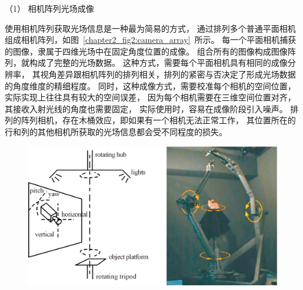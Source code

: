 

（1）
相机阵列光场成像


%
%
%


使用相机阵列获取光场信息是一种最为简易的方式，
通过排列多个普通平面相机组成相机阵列，如图~\ref{chapter2_fig2:camera_array}~所示。
每一个平面相机捕获的图像，隶属于四维光场中在固定角度位置的成像。
组合所有的图像构成图像阵列，就构成了完整的光场数据。
这种方式，需要每个平面相机具有相同的成像分辨率，
其视角差异跟相机阵列的排列相关，排列的紧密与否决定了形成光场数据的角度维度的精细程度。
同时，这种成像方式，需要校准每个相机的空间位置，实际实现上往往具有较大的空间误差，
因为每个相机需要在三维空间位置对齐，其接收入射光线的角度也需要固定，
实际使用时，容易在成像阶段引入噪声。
排列的阵列相机，存在木桶效应，即如果有一个相机无法正常工作，
其位置所在的行和列的其他相机所获取的光场信息都会受不同程度的损失。












\begin{figure}[t]
	\centering
	\includegraphics[width=0.75\linewidth]{figures/chapter2/time_seq2}
	\label{chapter2_fig3:time_seq2}
\end{figure}



